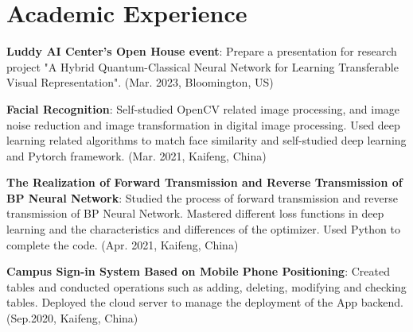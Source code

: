 \documentclass[letterpaper,10.8pt]{article}
\begin{document}
\section{Academic Experience}
\begin{description}[font=$\bullet$]
\item \textbf{Luddy AI Center’s Open House event}: Prepare a presentation for research project "A Hybrid Quantum-Classical Neural Network for Learning Transferable Visual Representation". (Mar. 2023, Bloomington, US)
\item \textbf{Facial Recognition}: Self-studied OpenCV related image processing, and image noise reduction and image transformation in digital image processing. Used deep learning related algorithms to match face similarity and self-studied deep learning and Pytorch framework. (Mar. 2021, Kaifeng, China)
\item \textbf{The Realization of Forward Transmission and Reverse Transmission of BP Neural Network}: Studied the process of forward transmission and reverse transmission of BP Neural Network. Mastered different loss functions in deep learning and the characteristics and differences of the optimizer. Used Python to complete the code. (Apr. 2021, Kaifeng, China)
\item \textbf{Campus Sign-in System Based on Mobile Phone Positioning}: Created tables and conducted operations such as adding, deleting, modifying and checking tables. Deployed the cloud server to manage the deployment of the App backend. (Sep.2020, Kaifeng, China)
\end{description}
\end{document}
